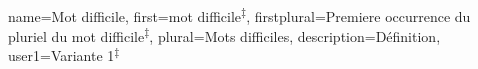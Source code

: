 {
	name=Mot difficile,
	first=mot difficile\textsuperscript{$\ddagger$}, %
	firstplural=Premiere occurrence du pluriel du mot difficile\textsuperscript{$\ddagger$},
	plural=Mots difficiles,
	description={Définition},
	user1={Variante 1\textsuperscript{$\ddagger$}}
}